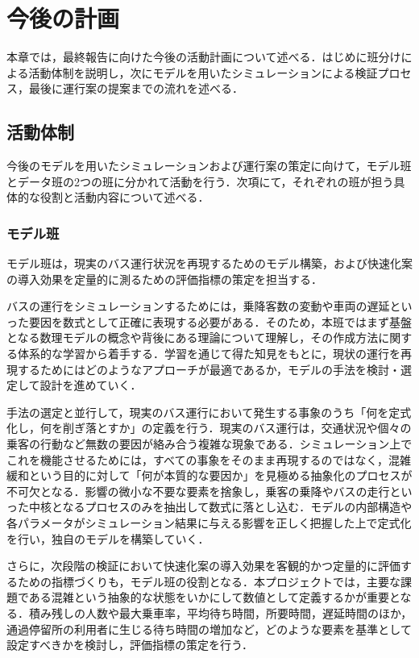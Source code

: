 \chapter{今後の計画}
本章では，最終報告に向けた今後の活動計画について述べる．はじめに班分けによる活動体制を説明し，次にモデルを用いたシミュレーションによる検証プロセス，最後に運行案の提案までの流れを述べる．

\section{活動体制}
今後のモデルを用いたシミュレーションおよび運行案の策定に向けて，モデル班とデータ班の2つの班に分かれて活動を行う．次項にて，それぞれの班が担う具体的な役割と活動内容について述べる．

\subsection{モデル班}
モデル班は，現実のバス運行状況を再現するためのモデル構築，および快速化案の導入効果を定量的に測るための評価指標の策定を担当する．

バスの運行をシミュレーションするためには，乗降客数の変動や車両の遅延といった要因を数式として正確に表現する必要がある．そのため，本班ではまず基盤となる数理モデルの概念や背後にある理論について理解し，その作成方法に関する体系的な学習から着手する．学習を通じて得た知見をもとに，現状の運行を再現するためにはどのようなアプローチが最適であるか，モデルの手法を検討・選定して設計を進めていく．

手法の選定と並行して，現実のバス運行において発生する事象のうち「何を定式化し，何を削ぎ落とすか」の定義を行う．現実のバス運行は，交通状況や個々の乗客の行動など無数の要因が絡み合う複雑な現象である．シミュレーション上でこれを機能させるためには，すべての事象をそのまま再現するのではなく，混雑緩和という目的に対して「何が本質的な要因か」を見極める抽象化のプロセスが不可欠となる．影響の微小な不要な要素を捨象し，乗客の乗降やバスの走行といった中核となるプロセスのみを抽出して数式に落とし込む．モデルの内部構造や各パラメータがシミュレーション結果に与える影響を正しく把握した上で定式化を行い，独自のモデルを構築していく．

さらに，次段階の検証において快速化案の導入効果を客観的かつ定量的に評価するための指標づくりも，モデル班の役割となる．本プロジェクトでは，主要な課題である混雑という抽象的な状態をいかにして数値として定義するかが重要となる．積み残しの人数や最大乗車率，平均待ち時間，所要時間，遅延時間のほか，通過停留所の利用者に生じる待ち時間の増加など，どのような要素を基準として設定すべきかを検討し，評価指標の策定を行う．


